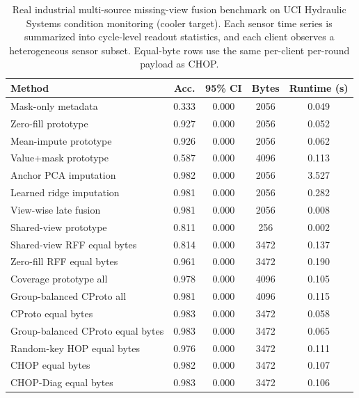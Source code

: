 \begin{table}[t]
\centering
\caption{Real industrial multi-source missing-view fusion benchmark on UCI Hydraulic Systems condition monitoring (cooler target). Each sensor time series is summarized into cycle-level readout statistics, and each client observes a heterogeneous sensor subset. Equal-byte rows use the same per-client per-round payload as CHOP.}
\label{tab:if-hydraulic-fusion}
\scriptsize
\setlength{\tabcolsep}{3pt}
\renewcommand{\arraystretch}{0.94}
\begin{tabular}{lcccc}
\toprule
Method & Acc. & 95\% CI & Bytes & Runtime (s) \\
\midrule
Mask-only metadata & 0.333 & 0.000 & 2056 & 0.049 \\
Zero-fill prototype & 0.927 & 0.000 & 2056 & 0.052 \\
Mean-impute prototype & 0.926 & 0.000 & 2056 & 0.062 \\
Value+mask prototype & 0.587 & 0.000 & 4096 & 0.113 \\
Anchor PCA imputation & 0.982 & 0.000 & 2056 & 3.527 \\
Learned ridge imputation & 0.981 & 0.000 & 2056 & 0.282 \\
View-wise late fusion & 0.981 & 0.000 & 2056 & 0.008 \\
Shared-view prototype & 0.811 & 0.000 & 256 & 0.002 \\
Shared-view RFF equal bytes & 0.814 & 0.000 & 3472 & 0.137 \\
Zero-fill RFF equal bytes & 0.961 & 0.000 & 3472 & 0.190 \\
Coverage prototype all & 0.978 & 0.000 & 4096 & 0.105 \\
Group-balanced CProto all & 0.981 & 0.000 & 4096 & 0.115 \\
CProto equal bytes & 0.983 & 0.000 & 3472 & 0.058 \\
Group-balanced CProto equal bytes & 0.983 & 0.000 & 3472 & 0.065 \\
Random-key HOP equal bytes & 0.976 & 0.000 & 3472 & 0.111 \\
CHOP equal bytes & 0.982 & 0.000 & 3472 & 0.107 \\
CHOP-Diag equal bytes & 0.983 & 0.000 & 3472 & 0.106 \\
\bottomrule
\end{tabular}
\end{table}

